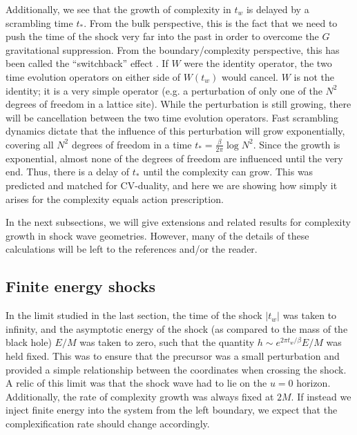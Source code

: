\documentclass[12pt]{article}
\numberwithin{equation}{section}
\begin{document}
Additionally, we see that the growth of complexity in $t_w$ is delayed by a scrambling time $t_*$. From the bulk perspective, this is the fact that we need to push the time of the shock very far into the past in order to overcome the $G$ gravitational suppression. From the boundary/complexity perspective, this has been called the  ``switchback'' effect \cite{complexityshocks}. If $W$ were the identity operator, the two time evolution operators on either side of $W(t_w)$ would cancel. $W$ is not the identity; it is a very simple operator (e.g. a perturbation of only one of the $N^2$ degrees of freedom in a lattice site). While the perturbation is still growing, there will be cancellation between the two time evolution operators. Fast scrambling dynamics dictate that the influence of this perturbation will grow exponentially, covering all $N^2$ degrees of freedom in a time $t_* = \frac{\beta}{2\pi}\log N^2$. Since the growth is exponential, almost none of the degrees of freedom are influenced until the very end. Thus, there is a delay of $t_*$ until the complexity can grow. This was predicted and matched \cite{complexityshocks} for  CV-duality, and here we are showing how simply it arises for the complexity equals action prescription.

In the next subsections, we will give extensions and related results for complexity growth in shock wave geometries. However, many of the details of these calculations will be left to the references and/or the reader.

\subsection{Finite energy shocks}
In the limit studied in the last section, the time of the shock $|t_w|$ was taken to infinity, and the asymptotic energy of the shock (as compared to the mass of the black hole) $E/M$ was taken to zero, such that the quantity $h \sim e^{2\pi t_w / \beta} E/M$ was held fixed. This was to ensure that the precursor was a small perturbation and provided a simple relationship between the coordinates when crossing the shock. A relic of this limit was that the shock wave had to lie on the $u=0$ horizon. Additionally, the rate of complexity growth was always fixed at $2M$. If instead we inject finite energy into the system from the left boundary, we expect that the complexification rate should change accordingly.
\end{document}
